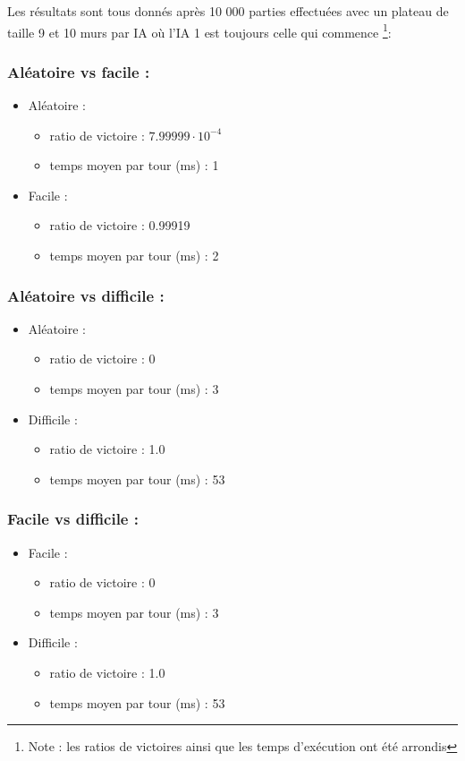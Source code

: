 \documentclass[a4paper, 12pt]{article}
\begin{document}
Les résultats sont tous donnés après 10 000 parties effectuées avec un plateau de taille 9 et 10 murs par IA où l'IA 1 est toujours celle qui commence \footnote{Note : les ratios de victoires ainsi que les temps d'exécution ont été arrondis}:

\subsubsection{Aléatoire vs facile :}
\begin{itemize}
\item[1)] Aléatoire : 
\begin{itemize}
\item[-] ratio de victoire : $7.99999 \cdot 10^{-4}$
\item[-] temps moyen par tour (ms) : 1
\end{itemize}
\item[2)] Facile : 
\begin{itemize}
\item[-] ratio de victoire : 0.99919
\item[-] temps moyen par tour (ms) : 2
\end{itemize}
\end{itemize}

\subsubsection{Aléatoire vs difficile :}
\begin{itemize}
\item[1)] Aléatoire : 
\begin{itemize}
\item[-] ratio de victoire : 0
\item[-] temps moyen par tour (ms) : 3
\end{itemize}
\item[2)] Difficile : 
\begin{itemize}
\item[-] ratio de victoire : 1.0
\item[-] temps moyen par tour (ms) : 53
\end{itemize}
\end{itemize}

\subsubsection{Facile vs difficile :}
\begin{itemize}
\item[1)] Facile : 
\begin{itemize}
\item[-] ratio de victoire : 0
\item[-] temps moyen par tour (ms) : 3
\end{itemize}
\item[2)] Difficile : 
\begin{itemize}
\item[-] ratio de victoire : 1.0
\item[-] temps moyen par tour (ms) : 53
\end{itemize}
\end{itemize}
\end{document}
